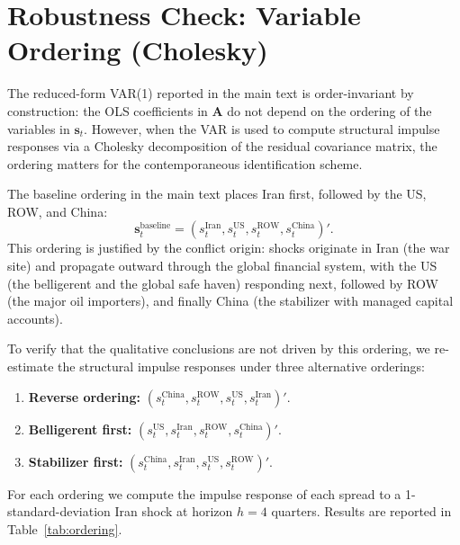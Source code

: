 \documentclass[12pt,a4paper]{article}
\begin{document}

\section{Robustness Check: Variable Ordering (Cholesky)}
\label{app:ordering}

The reduced-form VAR(1) reported in the main text is order-invariant by construction: the OLS coefficients in $\mathbf{A}$ do not depend on the ordering of the variables in $\mathbf{s}_t$. However, when the VAR is used to compute structural impulse responses via a Cholesky decomposition of the residual covariance matrix, the ordering matters for the contemporaneous identification scheme.

The baseline ordering in the main text places Iran first, followed by the US, ROW, and China:
\begin{equation}
\mathbf{s}_t^{\text{baseline}} = (s^{\text{Iran}}_t, s^{\text{US}}_t, s^{\text{ROW}}_t, s^{\text{China}}_t)'.
\end{equation}
This ordering is justified by the conflict origin: shocks originate in Iran (the war site) and propagate outward through the global financial system, with the US (the belligerent and the global safe haven) responding next, followed by ROW (the major oil importers), and finally China (the stabilizer with managed capital accounts).

To verify that the qualitative conclusions are not driven by this ordering, we re-estimate the structural impulse responses under three alternative orderings:
\begin{enumerate}[itemsep=2pt, topsep=2pt]
    \item \textbf{Reverse ordering:} $(s^{\text{China}}_t, s^{\text{ROW}}_t, s^{\text{US}}_t, s^{\text{Iran}}_t)'$.
    \item \textbf{Belligerent first:} $(s^{\text{US}}_t, s^{\text{Iran}}_t, s^{\text{ROW}}_t, s^{\text{China}}_t)'$.
    \item \textbf{Stabilizer first:} $(s^{\text{China}}_t, s^{\text{Iran}}_t, s^{\text{US}}_t, s^{\text{ROW}}_t)'$.
\end{enumerate}
For each ordering we compute the impulse response of each spread to a 1-standard-deviation Iran shock at horizon $h = 4$ quarters. Results are reported in Table~\ref{tab:ordering}.
\end{document}
